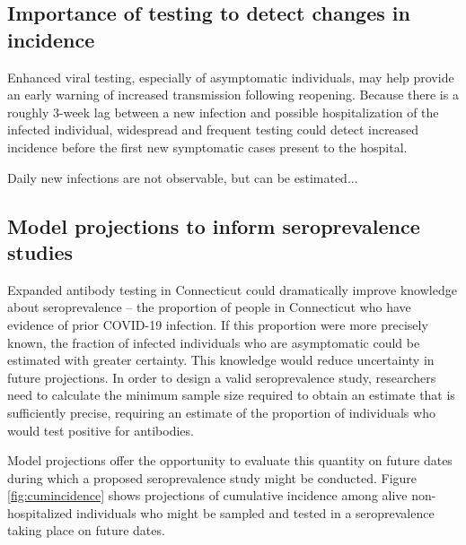 \documentclass[11pt]{article}
\begin{document}
\subsection*{Importance of testing to detect changes in incidence}

Enhanced viral testing, especially of asymptomatic individuals, may help provide an early warning of increased transmission following reopening.  Because there is a roughly 3-week lag between a new infection and possible hospitalization of the infected individual, widespread and frequent testing could detect increased incidence before the first new symptomatic cases present to the hospital.  

Daily new infections are not observable, but can be estimated...









\subsection*{Model projections to inform seroprevalence studies}

Expanded antibody testing in Connecticut could dramatically improve knowledge about seroprevalence -- the proportion of people in Connecticut who have evidence of prior COVID-19 infection. If this proportion were more precisely known, the fraction of infected individuals who are asymptomatic could be estimated with greater certainty.   This knowledge would reduce uncertainty in future projections.  In order to design a valid seroprevalence study, researchers need to calculate the minimum sample size required to obtain an estimate that is sufficiently precise, requiring an estimate of the proportion of individuals who would test positive for antibodies. 

Model projections offer the opportunity to evaluate this quantity on future dates during which a proposed seroprevalence study might be conducted.  Figure \ref{fig:cumincidence} shows projections of cumulative incidence among alive non-hospitalized individuals who might be sampled and tested in a seroprevalence taking place on future dates.  
\end{document}
